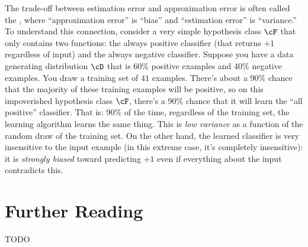 The trade-off between estimation error and approximation error is often called the , where ``approximation error'' is ``bias'' and ``estimation error'' is ``variance.''
To understand this connection, consider a very simple hypothesis class $\cF$ that only contains two functions: the always positive classifier (that returns $+1$ regardless of input) and the always negative classifier.
Suppose you have a data generating distribution $\cD$ that is 60\% positive examples and 40\% negative examples.
You draw a training set of $41$ examples.
There's about a 90\% chance that the majority of these training examples will be positive, so on this impoverished hypothesis class $\cF$, there's a 90\% chance that it will learn the ``all positive'' classifier.
That is: 90\% of the time, regardless of the training set, the learning algorithm learns the same thing.
This is \emph{low variance} as a function of the random draw of the training set.
On the other hand, the learned classifier is very insensitive to the input example (in this extreme case, it's completely insensitive): it is \emph{strongly biased} toward predicting $+1$ even if everything about the input contradicts this.


\section{Further Reading}

TODO






